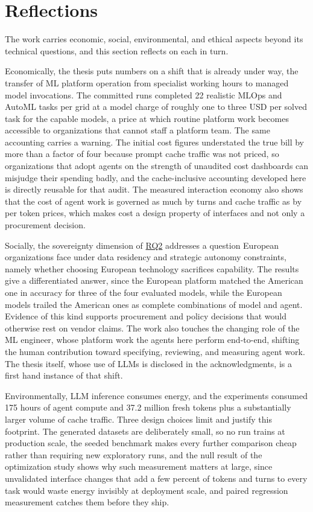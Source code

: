 \documentclass[
english,                 %
bibtex,                  %
]{kththesis}
\newcommand*{\analysisComputeHours}{175}
\newcommand*{\analysisFreshTokens}{37.2 million}
\numberwithin{listing}{chapter}
\begin{document}
\section{Reflections}
\label{sec:reflections}
\glsresetall

The work carries economic, social, environmental, and ethical aspects beyond its technical questions, and this section reflects on each in turn.

Economically, the thesis puts numbers on a shift that is already under way, the transfer of \gls{ML} platform operation from specialist working hours to managed model invocations. The committed runs completed 22 realistic \gls{MLOps} and \gls{AutoML} tasks per grid at a model charge of roughly one to three \gls{USD} per solved task for the capable models, a price at which routine platform work becomes accessible to organizations that cannot staff a platform team. The same accounting carries a warning. The initial cost figures understated the true bill by more than a factor of four because prompt cache traffic was not priced, so organizations that adopt agents on the strength of unaudited cost dashboards can misjudge their spending badly, and the cache-inclusive accounting developed here is directly reusable for that audit. The measured interaction economy also shows that the cost of agent work is governed as much by turns and cache traffic as by per token prices, which makes cost a design property of interfaces and not only a procurement decision.

Socially, the sovereignty dimension of \hyperref[rq2]{RQ2} addresses a question European organizations face under data residency and strategic autonomy constraints, namely whether choosing European technology sacrifices capability. The results give a differentiated answer, since the European platform matched the American one in accuracy for three of the four evaluated models, while the European models trailed the American ones as complete combinations of model and agent. Evidence of this kind supports procurement and policy decisions that would otherwise rest on vendor claims. The work also touches the changing role of the \gls{ML} engineer, whose platform work the agents here perform end-to-end, shifting the human contribution toward specifying, reviewing, and measuring agent work. The thesis itself, whose use of \glspl{LLM} is disclosed in the acknowledgments, is a first hand instance of that shift.

Environmentally, \gls{LLM} inference consumes energy, and the experiments consumed \analysisComputeHours{} hours of agent compute and \analysisFreshTokens{} fresh tokens plus a substantially larger volume of cache traffic. Three design choices limit and justify this footprint. The generated datasets are deliberately small, so no run trains at production scale, the seeded benchmark makes every further comparison cheap rather than requiring new exploratory runs, and the null result of the optimization study shows why such measurement matters at large, since unvalidated interface changes that add a few percent of tokens and turns to every task would waste energy invisibly at deployment scale, and paired regression measurement catches them before they ship.
\end{document}
